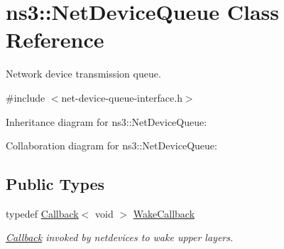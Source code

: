 \hypertarget{classns3_1_1NetDeviceQueue}{}\section{ns3\+:\+:Net\+Device\+Queue Class Reference}
\label{classns3_1_1NetDeviceQueue}


Network device transmission queue.  




{\ttfamily \#include $<$net-\/device-\/queue-\/interface.\+h$>$}



Inheritance diagram for ns3\+:\+:Net\+Device\+Queue\+:


Collaboration diagram for ns3\+:\+:Net\+Device\+Queue\+:
\subsection*{Public Types}
\begin{DoxyCompactItemize}
\item 
typedef \hyperlink{classns3_1_1Callback}{Callback}$<$ void $>$ \hyperlink{classns3_1_1NetDeviceQueue_af33b3e91885b68cc983c87b131826300}{Wake\+Callback}
\begin{DoxyCompactList}\small\item\em \hyperlink{classns3_1_1Callback}{Callback} invoked by netdevices to wake upper layers. \end{DoxyCompactList}\end{DoxyCompactItemize}
